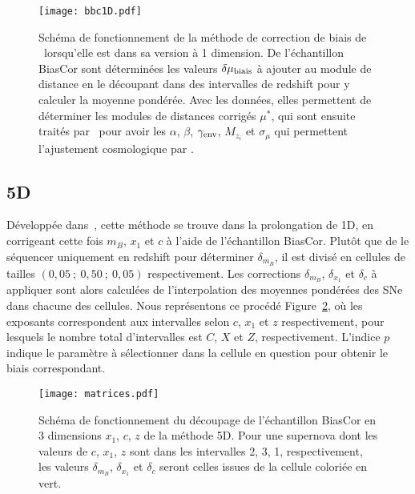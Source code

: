 \documentclass[../main/main.tex]{subfiles}
\begin{document}
\begin{figure}[]
    \centering
    \texttt{[image: bbc1D.pdf]}
    \caption[Schéma de fonctionnement de la méthode de correction de biais de
    \bbc1D]{Schéma de fonctionnement de la méthode de correction de biais de
        \bbc\ lorsqu'elle est dans sa version à 1 dimension. De l'échantillon
        BiasCor sont déterminées les valeurs $\delta\mu_{\rm biais}$ à ajouter
        au module de distance en le découpant dans des intervalles de redshift
        pour y calculer la moyenne pondérée. Avec les données, elles permettent
        de déterminer les modules de distances corrigés $\mu^*$, qui sont
        ensuite traités par \saltmu\ pour avoir les $\alpha$, $\beta$,
        $\gamma_{\rm env}$, $M_{z_i}$ et $\sigma_{\mu}$ qui permettent
    l'ajustement cosmologique par \wfit.}\label{fig:bbc1d}
\end{figure}

\subsection{\bbc5D}\label{ssec:bbc5D}

Développée dans~\cite{kessler2017}, cette méthode se trouve dans la prolongation
de \bbc1D, en corrigeant cette fois $m_B$, $x_1$ et $c$ à l'aide de
l'échantillon BiasCor. Plutôt que de le séquencer uniquement en redshift pour
déterminer $\delta_{m_B}$, il est divisé en cellules de tailles
$(0,05~;~0,50~;~0,05)$ respectivement. Les corrections $\delta_{m_B}$,
$\delta_{x_1}$ et $\delta_c$ à appliquer sont alors calculées de l'interpolation
des moyennes pondérées des SNe dans chacune des cellules. Nous représentons ce
procédé Figure~\ref{fig:mat}, où les exposants correspondent aux intervalles
selon $c$, $x_1$ et $z$ respectivement, pour lesquels le nombre total
d'intervalles est $C$, $X$ et $Z$, respectivement. L'indice $p$ indique le
paramètre à sélectionner dans la cellule en question pour obtenir le biais
correspondant.

\begin{figure}[ht]
    \centering
    \texttt{[image: matrices.pdf]}
    \caption[Schéma de fonctionnement du découpage de l'échantillon BiasCor en 3
    dimensions $x_1$, $c$, $z$ de la méthode \bbc5D]{Schéma de
        fonctionnement du découpage de l'échantillon BiasCor en 3 dimensions
        $x_1$, $c$, $z$ de la méthode \bbc5D. Pour une supernova dont les
        valeurs de $c$, $x_1$, $z$ sont dans les intervalles 2, 3, 1,
        respectivement, les valeurs $\delta_{m_B}$, $\delta_{x_1}$ et $\delta_c$
    seront celles issues de la cellule coloriée en vert.}
    \label{fig:mat}
\end{figure}
\end{document}
